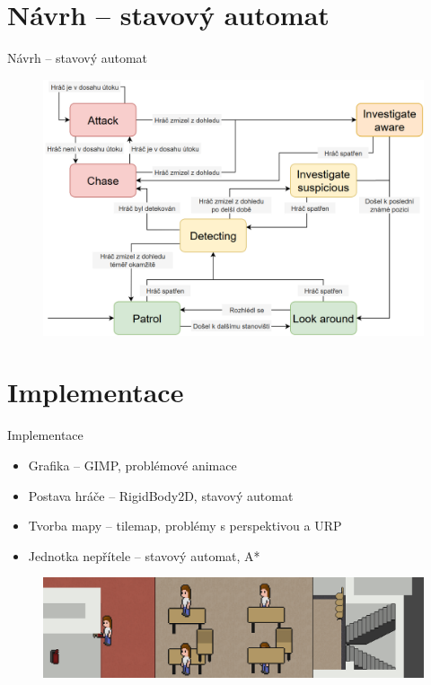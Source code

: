 \documentclass[10pt]{beamer}
\begin{document}
	\section{Návrh – stavový automat}
	\begin{frame}{Návrh – stavový automat}
		\begin{figure}[h]
			\centering
			\includegraphics[width=\textwidth]{Images/FSM}
		\end{figure}
	\end{frame}
	
	\section{Implementace}
	\begin{frame}{Implementace}
		\begin{itemize}\setlength\itemsep{10pt}
			\item Grafika – GIMP, problémové animace
			\item Postava hráče – RigidBody2D, stavový automat
			\item Tvorba mapy – tilemap, problémy s perspektivou a URP
			\item Jednotka nepřítele – stavový automat, A*
		\end{itemize}
		\vfill
		\begin{figure}[h]
			\centering
			\includegraphics[width=\textwidth]{Images/Perspective}
		\end{figure}
	\end{frame}
	
\end{document}
